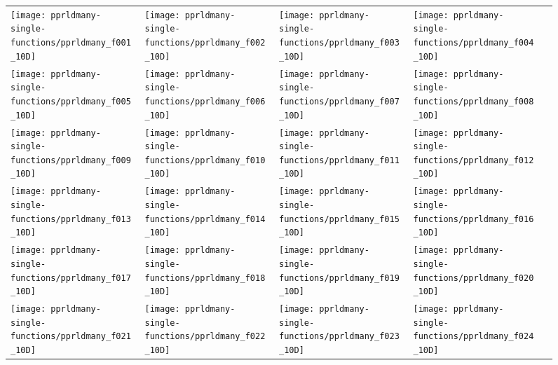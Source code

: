 \documentclass[sigconf]{acmart}
\begin{document}
{%

\begin{figure*}
\centering
\begin{tabular}{@{}l@{}l@{}l@{}l@{}l@{}}
\texttt{[image: pprldmany-single-functions/pprldmany\_f001\_10D]}&
\texttt{[image: pprldmany-single-functions/pprldmany\_f002\_10D]}&
\texttt{[image: pprldmany-single-functions/pprldmany\_f003\_10D]}&
\texttt{[image: pprldmany-single-functions/pprldmany\_f004\_10D]}\\
\texttt{[image: pprldmany-single-functions/pprldmany\_f005\_10D]}&
\texttt{[image: pprldmany-single-functions/pprldmany\_f006\_10D]}&
\texttt{[image: pprldmany-single-functions/pprldmany\_f007\_10D]}&
\texttt{[image: pprldmany-single-functions/pprldmany\_f008\_10D]}\\
\texttt{[image: pprldmany-single-functions/pprldmany\_f009\_10D]}&
\texttt{[image: pprldmany-single-functions/pprldmany\_f010\_10D]}&
\texttt{[image: pprldmany-single-functions/pprldmany\_f011\_10D]}&
\texttt{[image: pprldmany-single-functions/pprldmany\_f012\_10D]}\\
\texttt{[image: pprldmany-single-functions/pprldmany\_f013\_10D]}&
\texttt{[image: pprldmany-single-functions/pprldmany\_f014\_10D]}&
\texttt{[image: pprldmany-single-functions/pprldmany\_f015\_10D]}&
\texttt{[image: pprldmany-single-functions/pprldmany\_f016\_10D]}\\
\texttt{[image: pprldmany-single-functions/pprldmany\_f017\_10D]}&
\texttt{[image: pprldmany-single-functions/pprldmany\_f018\_10D]}&
\texttt{[image: pprldmany-single-functions/pprldmany\_f019\_10D]}&
\texttt{[image: pprldmany-single-functions/pprldmany\_f020\_10D]}\\
\texttt{[image: pprldmany-single-functions/pprldmany\_f021\_10D]}&
\texttt{[image: pprldmany-single-functions/pprldmany\_f022\_10D]}&
\texttt{[image: pprldmany-single-functions/pprldmany\_f023\_10D]}&
\texttt{[image: pprldmany-single-functions/pprldmany\_f024\_10D]}
\end{tabular}
 \caption{\label{fig:ECDFsingleOne}
}
\end{figure*}


}
\end{document}
